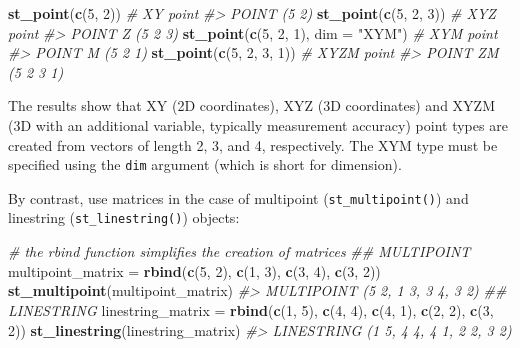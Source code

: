 \documentclass[]{krantz}
\newenvironment{Shaded}{\begin{snugshade}}{\end{snugshade}}
\newcommand{\CommentTok}[1]{\textcolor[rgb]{0.37,0.37,0.37}{\textit{#1}}}
\newcommand{\DataTypeTok}[1]{\textcolor[rgb]{0.27,0.27,0.27}{#1}}
\newcommand{\DecValTok}[1]{\textcolor[rgb]{0.06,0.06,0.06}{#1}}
\newcommand{\KeywordTok}[1]{\textcolor[rgb]{0.27,0.27,0.27}{\textbf{#1}}}
\newcommand{\NormalTok}[1]{#1}
\newcommand{\StringTok}[1]{\textcolor[rgb]{0.5,0.5,0.5}{#1}}
\begin{document}
\begin{Shaded}
\begin{Highlighting}[]
\KeywordTok{st_point}\NormalTok{(}\KeywordTok{c}\NormalTok{(}\DecValTok{5}\NormalTok{, }\DecValTok{2}\NormalTok{))                 }\CommentTok{# XY point}
\CommentTok{#> POINT (5 2)}
\KeywordTok{st_point}\NormalTok{(}\KeywordTok{c}\NormalTok{(}\DecValTok{5}\NormalTok{, }\DecValTok{2}\NormalTok{, }\DecValTok{3}\NormalTok{))              }\CommentTok{# XYZ point}
\CommentTok{#> POINT Z (5 2 3)}
\KeywordTok{st_point}\NormalTok{(}\KeywordTok{c}\NormalTok{(}\DecValTok{5}\NormalTok{, }\DecValTok{2}\NormalTok{, }\DecValTok{1}\NormalTok{), }\DataTypeTok{dim =} \StringTok{"XYM"}\NormalTok{) }\CommentTok{# XYM point}
\CommentTok{#> POINT M (5 2 1)}
\KeywordTok{st_point}\NormalTok{(}\KeywordTok{c}\NormalTok{(}\DecValTok{5}\NormalTok{, }\DecValTok{2}\NormalTok{, }\DecValTok{3}\NormalTok{, }\DecValTok{1}\NormalTok{))           }\CommentTok{# XYZM point}
\CommentTok{#> POINT ZM (5 2 3 1)}
\end{Highlighting}
\end{Shaded}

The results show that XY (2D coordinates), XYZ (3D coordinates) and XYZM (3D with an additional variable, typically measurement accuracy) point types are created from vectors of length 2, 3, and 4, respectively.
The XYM type must be specified using the \texttt{dim} argument (which is short for dimension).

By contrast, use matrices in the case of multipoint (\texttt{st\_multipoint()}) and linestring (\texttt{st\_linestring()}) objects:

\begin{Shaded}
\begin{Highlighting}[]
\CommentTok{# the rbind function simplifies the creation of matrices}
\CommentTok{## MULTIPOINT}
\NormalTok{multipoint_matrix =}\StringTok{ }\KeywordTok{rbind}\NormalTok{(}\KeywordTok{c}\NormalTok{(}\DecValTok{5}\NormalTok{, }\DecValTok{2}\NormalTok{), }\KeywordTok{c}\NormalTok{(}\DecValTok{1}\NormalTok{, }\DecValTok{3}\NormalTok{), }\KeywordTok{c}\NormalTok{(}\DecValTok{3}\NormalTok{, }\DecValTok{4}\NormalTok{), }\KeywordTok{c}\NormalTok{(}\DecValTok{3}\NormalTok{, }\DecValTok{2}\NormalTok{))}
\KeywordTok{st_multipoint}\NormalTok{(multipoint_matrix)}
\CommentTok{#> MULTIPOINT (5 2, 1 3, 3 4, 3 2)}
\CommentTok{## LINESTRING}
\NormalTok{linestring_matrix =}\StringTok{ }\KeywordTok{rbind}\NormalTok{(}\KeywordTok{c}\NormalTok{(}\DecValTok{1}\NormalTok{, }\DecValTok{5}\NormalTok{), }\KeywordTok{c}\NormalTok{(}\DecValTok{4}\NormalTok{, }\DecValTok{4}\NormalTok{), }\KeywordTok{c}\NormalTok{(}\DecValTok{4}\NormalTok{, }\DecValTok{1}\NormalTok{), }\KeywordTok{c}\NormalTok{(}\DecValTok{2}\NormalTok{, }\DecValTok{2}\NormalTok{), }\KeywordTok{c}\NormalTok{(}\DecValTok{3}\NormalTok{, }\DecValTok{2}\NormalTok{))}
\KeywordTok{st_linestring}\NormalTok{(linestring_matrix)}
\CommentTok{#> LINESTRING (1 5, 4 4, 4 1, 2 2, 3 2)}
\end{Highlighting}
\end{Shaded}
\end{document}
